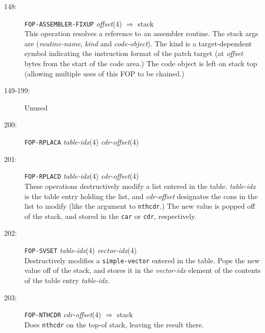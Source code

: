 \begin{description}
\item[148:] \hspace{2em} {\tt FOP-ASSEMBLER-FIXUP} \hspace{2em} {\it offset}(4)
\hspace{2em} $\Rightarrow$ \hspace{2em} stack\\
This operation resolves a reference to an assembler routine.  The stack args
are ({\it routine-name}, {\it kind} and {\it code-object}).  The kind is a
target-dependent symbol indicating the instruction format of the patch target
(at {\it offset} bytes from the start of the code area.)  The code object is
left on stack top (allowing multiple uses of this FOP to be chained.)

\item[149-199:] Unused

\item[200:] \hspace{2em} {\tt FOP-RPLACA} \hspace{2em} {\it table-idx}(4)
\hspace{2em} {\it cdr-offset}(4)\\

\item[201:] \hspace{2em} {\tt FOP-RPLACD} \hspace{2em} {\it table-idx}(4)
\hspace{2em} {\it cdr-offset}(4)\\
These operations destructively modify a list entered in the table.  {\it
table-idx} is the table entry holding the list, and {\it cdr-offset} designates
the cons in the list to modify (like the argument to {\tt nthcdr}.)  The new
value is popped off of the stack, and stored in the {\tt car} or {\tt cdr},
respectively.

\item[202:] \hspace{2em} {\tt FOP-SVSET} \hspace{2em} {\it table-idx}(4)
\hspace{2em} {\it vector-idx}(4)\\
Destructively modifies a {\tt simple-vector} entered in the table.  Pops the
new value off of the stack, and stores it in the {\it vector-idx} element of
the contents of the table entry {\it table-idx.}

\item[203:] \hspace{2em} {\tt FOP-NTHCDR} \hspace{2em} {\it cdr-offset}(4)
\hspace{2em} $\Rightarrow$ \hspace{2em} stack\\
Does {\tt nthcdr} on the top-of stack, leaving the result there.


\end{description}
